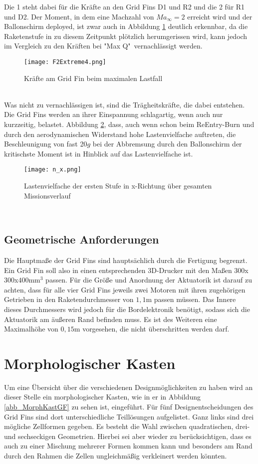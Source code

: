 Die 1 steht dabei für die Kräfte an den Grid Fins D1 und R2 und die 2 für R1 und D2.
Der Moment, in dem eine Machzahl von $Ma_\infty = 2$ erreicht wird und der Ballonschirm deployed, ist zwar auch in Abbildung \ref{abb_FExtreme} deutlich erkennbar, da die Raketenstufe in zu diesem Zeitpunkt plötzlich herumgerissen wird, kann jedoch im Vergleich zu den Kräften bei "Max Q"\ vernachlässigt werden.
\begin{figure}[h] 
	\centering
	\texttt{[image: F2Extreme4.png]}
	\caption{Kräfte am Grid Fin beim maximalen Lastfall}
	\label{abb_FExtreme}
\end{figure}\\
Was nicht zu vernachlässigen ist, sind die Trägheitskräfte, die dabei entstehen. Die Grid Fins werden an ihrer Einspannung schlagartig, wenn auch nur kurzzeitig, belastet. Abbildung \ref{abb_n_x}, dass, auch wenn schon beim ReEntry-Burn und durch den aerodynamischen Widerstand hohe Lastenvielfache auftreten, die Beschleunigung von fast 20$g$ bei der Abbremsung durch den Ballonschirm der kritischste Moment ist in Hinblick auf das Lastenvielfache ist.
\begin{figure}[h] 
	\centering
	\texttt{[image: n\_x.png]}
	\caption{Lastenvielfache der ersten Stufe in x-Richtung über gesamten Missionsverlauf}
	\label{abb_n_x}
\end{figure}\\
\subsection{Geometrische Anforderungen}
Die Hauptmaße der Grid Fins sind hauptsächlich durch die Fertigung begrenzt. Ein Grid Fin soll also in einen entsprechenden 3D-Drucker mit den Maßen $300$x$300$x$400\mathrm{mm}^3$ passen. Für die Größe und Anordnung der Aktuatorik ist darauf zu achten, dass für alle vier Grid Fins jeweils zwei Motoren mit ihren zugehörigen Getrieben in den Raketendurchmesser von $1,1$m passen müssen. Das Innere dieses Durchmessers wird jedoch für die Bordelektronik benötigt, sodass sich die Aktuatorik am äußeren Rand befinden muss. Es ist des Weiteren eine Maximalhöhe von $0,15$m vorgesehen, die nicht überschritten werden darf.
\newpage
\section{Morphologischer Kasten}
Um eine Übersicht über die verschiedenen Designmöglichkeiten zu haben wird an dieser Stelle ein morphologischer Kasten, wie in er in Abbildung \ref{abb_MorphKastGF} zu sehen ist, eingeführt. Für fünf Designentscheidungen des Grid Fins sind dort unterschiedliche Teillösungen aufgelistet. Ganz links sind drei mögliche Zellformen gegeben. Es besteht die Wahl zwischen quadratischen, drei- und sechseckigen Geometrien. Hierbei sei aber wieder zu berücksichtigen, dass es auch zu einer Mischung mehrerer Formen kommen kann und besonders am Rand durch den Rahmen die Zellen ungleichmäßig verkleinert werden könnten.


